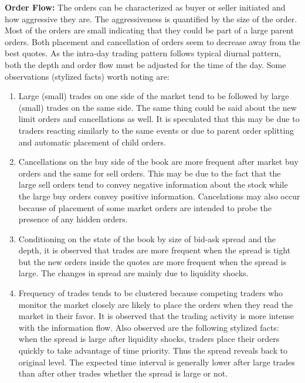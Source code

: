\noindent\textbf{Order Flow:} The orders can be characterized as buyer or seller initiated and how aggressive they are. The aggressiveness is quantified by the size of the order. Most of the orders are small indicating that they could be part of a large parent orders. Both placement and cancellation of orders seem to decrease away from the best quotes. As the intra-day trading pattern follows typical diurnal pattern, both the depth and order flow must be adjusted for the time of the day. Some observations (stylized facts) worth noting are:
\begin{enumerate}[--]
\item Large (small) trades on one side of the market tend to be followed by large (small) trades on the same side. The same thing could be said about the new limit orders and cancellations as well. It is speculated that this may be due to traders reacting similarly to the same events or due to parent order splitting and automatic placement of child orders. \\

\item Cancellations on the buy side of the book are more frequent after market buy orders and the same for sell orders. This may be due to the fact that the large sell orders tend to convey negative information about the stock while the large buy orders convey positive information. Cancelations may also occur because of placement of some market orders are intended to probe the presence of any hidden orders. \\

\item Conditioning on the state of the book by size of bid-ask spread and the depth, it is observed that trades are more frequent when the spread is tight but the new orders inside the quotes are more frequent when the spread is large. The changes in spread are mainly due to liquidity shocks. \\

\item Frequency of trades tends to be clustered because competing traders who monitor the market closely are likely to place the orders when they read the market in their favor. It is observed that the trading activity is more intense with the information flow. Also observed are the following stylized facts: when the spread is large after liquidity shocks, traders place their orders quickly to take advantage of time priority. Thus the spread reveals back to original level. The expected time interval is generally lower after large trades than after other trades whether the spread is large or not.
\end{enumerate}


